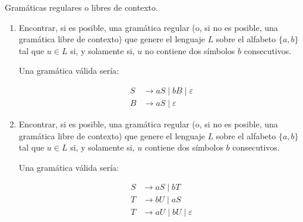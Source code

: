 \documentclass[12pt]{book} %
\begin{document}
\begin{ejercicio}
Gramáticas regulares o libres de contexto.

\begin{enumerate}[label=\alph*)]
    \item Encontrar, si es posible, una gramática regular (o, si no es posible, una gramática libre de contexto) que genere el lenguaje $L$ sobre el alfabeto $\{a, b\}$ tal que $u \in L$ si, y solamente si, $u$ no contiene dos símbolos $b$ consecutivos.

    \begin{solucion}[a)]
    Una gramática válida sería:

    \begin{align*}
        S &\to aS \mid bB \mid \varepsilon \\
        B &\to aS \mid \varepsilon
    \end{align*}
    \end{solucion}

    \item Encontrar, si es posible, una gramática regular (o, si no es posible, una gramática libre de contexto) que genere el lenguaje $L$ sobre el alfabeto $\{a, b\}$ tal que $u \in L$ si, y solamente si, $u$ contiene dos símbolos $b$ consecutivos.

    \begin{solucion}[b)]
    Una gramática válida sería:

    \begin{align*}
        S &\to aS \mid bT \\
        T &\to bU \mid aS \\
        T &\to aU \mid bU \mid \varepsilon \\
    \end{align*}
    \end{solucion}
\end{enumerate}
\end{ejercicio}
\end{document}
